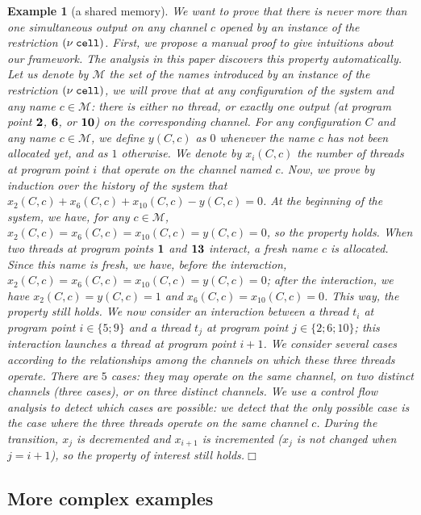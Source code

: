 \documentclass{article}
\newcommand{\boxexample}{$\Box$}
\newtheorem{example}[thm]{Example}
\newcommand{\nuu}{\nu\;}
\newcommand{\pp}[1]{$\bf{#1}$}
\newcommand{\internal}[1]{\textnormal{\texttt{#1}}}
\newcommand{\ccell}{\internal{cell}}
\newcommand{\memlaba}{1}
\newcommand{\memlabb}{2}
\newcommand{\memlabf}{6}
\newcommand{\memlabj}{10}
\newcommand{\memlabm}{13}
\begin{document}
{\begin{example}[a shared memory]
We want to prove that there is never more than one simultaneous output on any channel $c$ opened by an instance of the restriction $(\nuu \ccell)$.
First, we propose a manual proof to give intuitions about our framework.
The analysis in this paper discovers this property automatically.
Let us denote by $\mathcal{M}$ the set of the names introduced by an instance of the restriction $(\nuu \ccell)$, we will prove that at any configuration of the system and any name $c\in \mathcal{M}$: there is either no thread, or exactly one output (at program point \pp{\memlabb}, \pp{\memlabf}, or \pp{\memlabj}) on the corresponding channel.
For any configuration $C$ and any name $c\in\mathcal{M}$, we define $y(C,c)$ as $0$ whenever the name $c$ has not been allocated yet, and as $1$ otherwise. We denote by $x_i(C,c)$ the number of threads at program point $i$ that operate on the channel named $c$. 
Now, we prove by induction over the history of the system that $x_2(C,c)+x_6(C,c)+x_{\memlabj}(C,c)-y(C,c)=0$. At the beginning of the system, we have, for any $c\in\mathcal{M}$, $x_2(C,c)=x_6(C,c)=x_{\memlabj}(C,c)=y(C,c)=0$, so the property holds. 
When two threads at program points \pp{\memlaba} and \pp{\memlabm} interact, a fresh name $c$ is allocated. Since this name is fresh, we have, before the interaction, $x_2(C,c)=x_6(C,c)=x_{\memlabj}(C,c)=y(C,c)=0$; after the interaction,  we have $x_2(C,c)=y(C,c)=1$ and $x_6(C,c)=x_{\memlabj}(C,c)=0$. This way, the property still holds. 
We now consider an interaction  between a thread $t_i$ at program point $i\in \{5;9\}$ and a thread $t_j$ at program point $j\in\{2;6;10\}$; 
this interaction launches a thread at program point $i+1$.
We consider  several cases according to the relationships among the channels on which these three threads operate. 
There are $5$ cases: they may operate on the same channel, on two distinct channels (three cases), or on three distinct channels. 
We use a control flow analysis to detect which cases are possible: we detect that the only possible case is the case where the three threads operate on the same channel $c$. 
During the transition, $x_{j}$ is decremented and $x_{i+1}$ is incremented ($x_j$ is not changed when $j=i+1$), so the property of interest  still holds.\boxexample
\end{example}}

\subsection{More complex examples}
\end{document}
